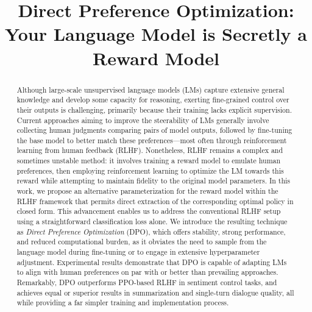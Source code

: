 \title{Direct Preference Optimization: Your Language Model is Secretly a Reward Model}

\begin{abstract}
Although large-scale unsupervised language models (LMs) capture extensive general knowledge and develop some capacity for reasoning, exerting fine-grained control over their outputs is challenging, primarily because their training lacks explicit supervision. Current approaches aiming to improve the steerability of LMs generally involve collecting human judgments comparing pairs of model outputs, followed by fine-tuning the base model to better match these preferences—most often through reinforcement learning from human feedback (RLHF). Nonetheless, RLHF remains a complex and sometimes unstable method: it involves training a reward model to emulate human preferences, then employing reinforcement learning to optimize the LM towards this reward while attempting to maintain fidelity to the original model parameters. In this work, we propose an alternative parameterization for the reward model within the RLHF framework that permits direct extraction of the corresponding optimal policy in closed form. This advancement enables us to address the conventional RLHF setup using a straightforward classification loss alone. We introduce the resulting technique as \textit{Direct Preference Optimization} (DPO), which offers stability, strong performance, and reduced computational burden, as it obviates the need to sample from the language model during fine-tuning or to engage in extensive hyperparameter adjustment. Experimental results demonstrate that DPO is capable of adapting LMs to align with human preferences on par with or better than prevailing approaches. Remarkably, DPO outperforms PPO-based RLHF in sentiment control tasks, and achieves equal or superior results in summarization and single-turn dialogue quality, all while providing a far simpler training and implementation process.
\end{abstract}

